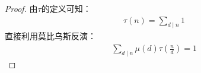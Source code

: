 \begin{proof}
    由$\tau$的定义可知：
    \begin{align*}
        \tau(n)=\sum_{d\mid n} 1
    \end{align*}
    直接利用莫比乌斯反演：
    \begin{align*}
        \sum_{d\mid n} {\mu(d)\tau(\frac{n}{d})}=1
    \end{align*}
\end{proof}
